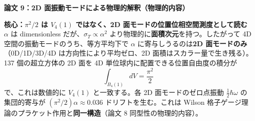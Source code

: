 \documentclass[9pt,a4paper]{ltjsarticle}
\begin{document}
\newpage

\begin{center}
{\large\bfseries 論文 9：2D 面振動モードによる物理的解釈（物理的内容）}
\end{center}

\vspace{2pt}

\begin{tcolorbox}[colback=gray!7,colframe=gray!55,boxrule=0.4pt,arc=2pt,left=4pt,right=4pt,top=2pt,bottom=2pt]
{\small
\textbf{核心：$\pi^2/2$ は $V_4(1)$ ではなく、2D 面モードの位置位相空間測度として読む}\enspace
$\alpha$ は dimensionless だが、$\sigma_T \propto \alpha^2$ より物理的に\textbf{面積次元}を持つ。したがって 4D 空間の振動モードのうち、等方平均下で $\alpha$ に寄与しうるのは\textbf{2D 面モードのみ}（0D/1D/3D/4D は方向性により平均ゼロ、2D 面積はスカラー量で生き残る）。137 個の超立方体の 2D 面を 4D 単位球内に配置できる位置自由度の積分が
\[ \int_{B_4(1)} dV = \frac{\pi^2}{2} \]
で、これは数値的に $V_4(1)$ と一致する。各 2D 面モードのゼロ点振動 $\tfrac{1}{2}\hbar\omega$ の集団的寄与が $(\pi^2/2)\alpha \approx 0.036$ ドリフトを生む。これは Wilson 格子ゲージ理論のプラケット作用と\textbf{同一構造}（論文 8 同型性の物理的内容）。}
\end{tcolorbox}

\vspace{2pt}
\end{document}
